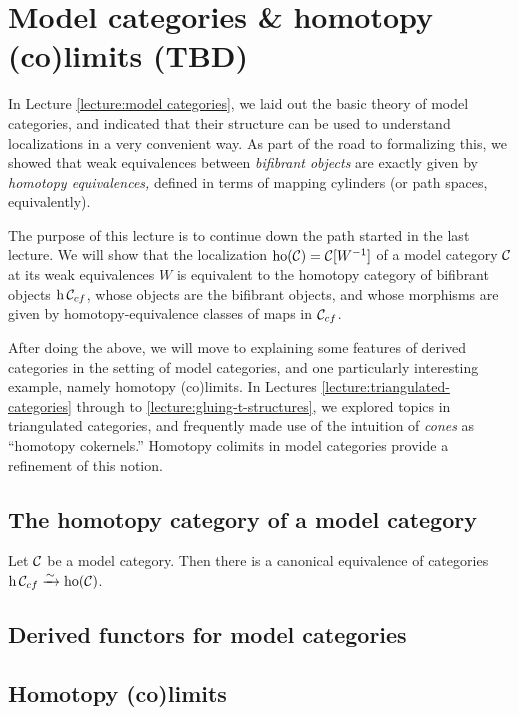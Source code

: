 
\section{Model categories \& homotopy (co)limits (TBD)}\label{lecture:model-categories-and-homotopy-colimits}
In Lecture \ref{lecture:model categories}, we laid out the basic theory of model categories, and indicated that their structure can be used to understand localizations
in a very convenient way. As part of the road to formalizing this, we showed that weak equivalences between \emph{bifibrant objects} are exactly given by
\emph{homotopy equivalences,} defined in terms of mapping cylinders (or path spaces, equivalently).

The purpose of this lecture is to continue down the path started in the last lecture. We will show that the localization \(\operatorname{ho}(\mathcal{C}) = \mathcal{C}[W^{-1}]\) of
a model category \(\mathcal{C}\) at its weak equivalences \(W\) is equivalent to the homotopy category of bifibrant objects \(\operatorname{h}{\mathcal{C}_{cf}}\), whose objects
are the bifibrant objects, and whose morphisms are given by homotopy-equivalence classes of maps in \(\mathcal{C}_{cf}\).

After doing the above, we will move to explaining some features of derived categories in the setting of model categories, and one particularly interesting example,
namely homotopy (co)limits. In Lectures \ref{lecture:triangulated-categories} through to \ref{lecture:gluing-t-structures}, we explored topics in triangulated categories,
and frequently made use of the intuition of \emph{cones} as ``homotopy cokernels.'' Homotopy colimits in model categories provide a refinement of this notion.

\subsection{The homotopy category of a model category}
\begin{theorem}
	Let \(\mathcal{C}\) be a model category. Then there is a canonical equivalence of categories \(\operatorname{h}{\mathcal{C}_{cf}} \xrightarrow{\sim} \operatorname{ho}(\mathcal{C})\).
\end{theorem}

\subsection{Derived functors for model categories}
\subsection{Homotopy (co)limits}
